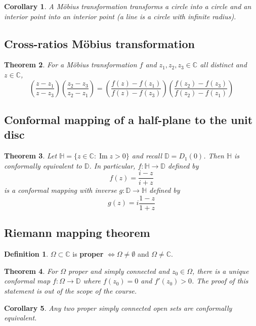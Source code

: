 \documentclass[12pt]{article}
\newtheorem{thm}{Theorem}[section]
\newtheorem{cor}[thm]{Corollary}
\theoremstyle{definition}
\newtheorem{defn}{Definition}[section]
\newcommand{\C}{\mathbb{C}}
\newcommand{\D}{\mathbb{D}}
\DeclareMathOperator{\im}{Im}
\begin{document}
\begin{cor}
  A M\"obius transformation transforms a circle into a circle and an interior point into an interior point (a line is a circle with infinite radius).
\end{cor}

\subsection{Cross-ratios M\"obius transformation}

\begin{thm}
  For a M\"obius transformation $f$ and $z_1, z_2, z_3 \in \C$ all distinct and $z \in \C$,
  $$\left(\frac{z - z_1}{z - z_3}\right)\left(\frac{z_2 - z_3}{z_2 - z_1}\right) = \left(\frac{f(z) - f(z_1)}{f(z) - f(z_3)}\right)\left(\frac{f(z_2) - f(z_3)}{f(z_2) - f(z_1)}\right)$$
\end{thm}

\subsection{Conformal mapping of a half-plane to the unit disc}

\begin{thm}
  Let $\mathbb{H} = \{z \in \C : \im{z} > 0\}$ and recall $\D = D_1(0)$.
  Then $\mathbb{H}$ is conformally equivalent to $\D$.
  In particular, $f : \mathbb{H} \to \D$ defined by
  $$f(z) = \frac{i - z}{i + z}$$
  is a conformal mapping with inverse $g : \D \to \mathbb{H}$ defined by
  $$g(z) = i\frac{1 - z}{1 + z}$$
\end{thm}

\subsection{Riemann mapping theorem}

\begin{defn}
  $\Omega \subset \C$ is \textbf{proper} $\iff \Omega \neq \emptyset$ and $\Omega \neq \C$.
\end{defn}

\begin{thm}
  For $\Omega$ proper and simply connected and $z_0 \in \Omega$, there is a unique conformal map $f : \Omega \to \D$ where $f(z_0) = 0$ and $f'(z_0) > 0$.
  The proof of this statement is out of the scope of the course.
\end{thm}

\begin{cor}
  Any two proper simply connected open sets are conformally equivalent.
\end{cor}
\end{document}
